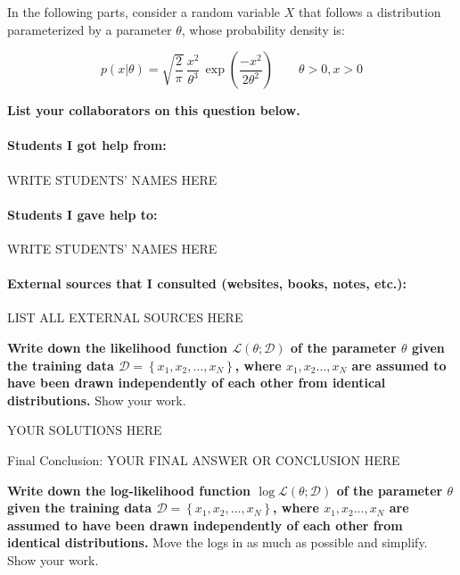 
In the following parts, consider a random variable $X$ that follows a distribution parameterized by a parameter $\theta$, whose probability density is:

\begin{equation*}
    p(x|\theta) = {\sqrt{\frac{2}{\pi}}}\,{\frac{x^{2}}{\theta^{3}}}\,\exp\!\left({\frac{-x^{2}}{2\theta^{2}}}\right) \qquad \theta > 0, x > 0
\end{equation*}

\textbf{List your collaborators on this question below. }

\begin{solution}

\paragraph{Students I got help from:} WRITE STUDENTS' NAMES HERE

\paragraph{Students I gave help to:} WRITE STUDENTS' NAMES HERE

\paragraph{External sources that I consulted (websites, books, notes, etc.):} LIST ALL EXTERNAL SOURCES HERE

\end{solution}

\qpart{[5 points]}
\textbf{Write down the likelihood function $\mathcal{L}(\theta; \mathcal{D})$ of the parameter $\theta$ given the training data $\mathcal{D} = \left\{x_1, x_2, \ldots, x_N \right\}$, where $x_1, x_2 \ldots, x_N$ are assumed to have been drawn independently of each other from identical distributions.} Show your work. 

\begin{solution}

YOUR SOLUTIONS HERE

{\color{red} Final Conclusion: YOUR FINAL ANSWER OR CONCLUSION HERE}

\end{solution}

\qpart{[5 points]}
\textbf{Write down the log-likelihood function $\log \mathcal{L}(\theta; \mathcal{D})$ of the parameter $\theta$ given the training data $\mathcal{D} = \left\{x_1, x_2, \ldots, x_N \right\}$, where $x_1, x_2 \ldots, x_N$ are assumed to have been drawn independently of each other from identical distributions.} Move the logs in as much as possible and simplify. Show your work. 

